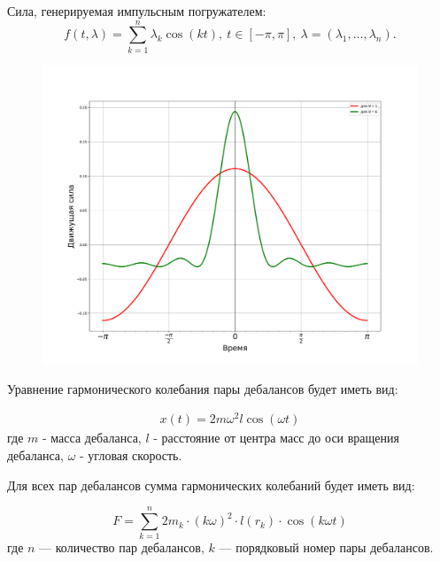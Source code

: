 \documentclass{beamer}
\begin{document}
    \begin{frame}
        Сила, генерируемая импульсным погружателем:
        \begin{equation}
            f(t,\lambda)=\sum_{k=1}^n \lambda_k\cos(kt),\ t\in [-\pi,\pi],\ \lambda =(\lambda_1, \ldots,\lambda_n).
        \end{equation}
        \begin{figure}
            \includegraphics[width=0.75\linewidth]{impulse_1vs6}
        \end{figure}
    \end{frame}

    \begin{frame}
        Уравнение гармонического колебания пары дебалансов будет иметь вид:

        \begin{equation}
            \begin{aligned}
                x(t) = 2 m \omega^2 l \cos (\omega t)
            \end{aligned}
        \end{equation}
        \noindent где $m$ - масса дебаланса, $l$ - расстояние от центра масс до оси вращения дебаланса, $\omega$ - угловая скорость.

        \noindent Для всех пар дебалансов сумма гармонических колебаний будет иметь вид:

        \begin{equation}
            \label{eq:F}
            F = \sum\limits_{k = 1}^n 2 m_k \cdot (k \omega)^2 \cdot l(r_k) \cdot \cos (k \omega t)
        \end{equation}
        \noindent где $n$ --- количество пар дебалансов, $k$ --- порядковый номер пары дебалансов.
    \end{frame}
\end{document}
